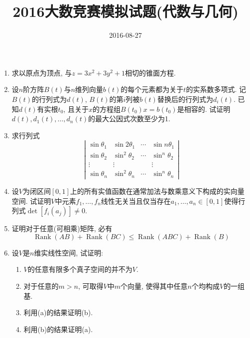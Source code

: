 \documentclass{article}
\title{2016大数竞赛模拟试题(代数与几何)}
\author{}
\date{2016-08-27}
\DeclareMathOperator{\rank}{Rank}
\begin{document}
\maketitle

\begin{enumerate}
  \item
    求以原点为顶点,
    与$z = 3 x^2 + 3 y^2 + 1$相切的锥面方程.
  \item
    设$n$阶方阵$B(t)$与$n$维列向量$b(t)$的每个元素都为关于$t$的实系数多项式.
    记$B(t)$的行列式为$d(t)$,
    $B(t)$的第$i$列被$b(t)$替换后的行列式为$d_i(t)$.
    已知$d(t)$有实根$t_0$,
    且关于$x$的方程组$B(t_0) x = b(t_0)$是相容的.
    试证明$d(t),d_1(t),\dotsc,d_n(t)$的最大公因式次数至少为1.
  \item
    求行列式
    \begin{equation}
      \left|
      \begin{array}{cccc}
        \sin \theta_1 & \sin 2 \theta_1 & \cdots & \sin n \theta_1 \\
        \sin \theta_2 & \sin^2 \theta_2 & \cdots & \sin^n \theta_2 \\
        \vdots & \vdots & & \vdots \\
        \sin \theta_n & \sin^2 \theta_n & \cdots & \sin^n \theta_n
      \end{array}
      \right|
    \end{equation}
  \item
    设$V$为闭区间$[0,1]$上的所有实值函数在通常加法与数乘意义下构成的实向量空间.
    试证明$V$中元素$f_1,\dotsc,f_n$线性无关当且仅当存在$a_1,\dotsc,a_n \in [0,1]$使得行列式$\det \left[ f_i(a_j) \right] \neq 0$.
  \item
    证明对于任意(可相乘)矩阵, 必有
    \begin{equation}
      \rank (AB) + \rank (BC) \leq \rank (ABC) + \rank (B)
    \end{equation}
  \item
    设$V$是$n$维实线性空间, 试证明:
    \begin{enumerate}
      \item
        $V$的任意有限多个真子空间的并不为$V$.
      \item
        对于任意的$m>n$,
        可取得$V$中$m$个向量,
        使得其中任意$n$个均构成$V$的一组基.
      \item
        利用(a)的结果证明(b).
      \item
        利用(b)的结果证明(a).
    \end{enumerate}
\end{enumerate}
\end{document}
